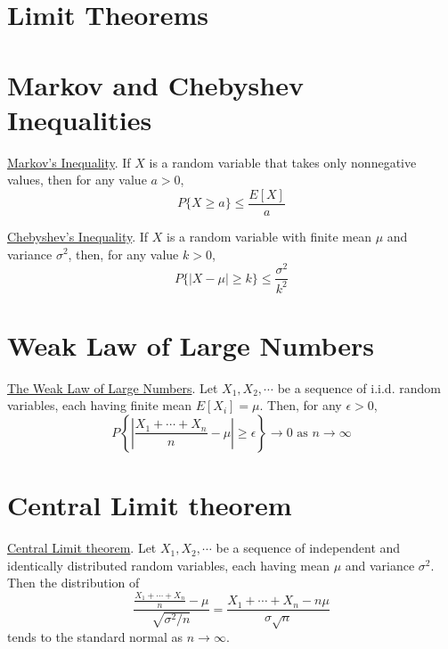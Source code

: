 \section{Limit Theorems}
\section{Markov and Chebyshev Inequalities}
\begin{thm}
	{\underline{Markov's Inequality}}. If $X$ is a random variable that takes only nonnegative values, then for any value $a > 0$, $$P\{X \ge a\} \le \frac{E[X]}{a}$$
\end{thm}

\begin{thm}
	{\underline{Chebyshev's Inequality}}. If $X$ is a random variable with finite mean $\mu$ and variance $\sigma^2$, then, for any value $k > 0$, $$P\{|X-\mu| \ge k\} \le \frac{\sigma^2}{k^2}$$
\end{thm}

\section{Weak Law of Large Numbers}
\begin{thm}
	{\underline{The Weak Law of Large Numbers}}. Let $X_1, X_2, \cdots$ be a sequence of i.i.d. random variables, each having finite mean $E[X_i] = \mu$. Then, for any $\epsilon > 0$, $$P\left\{\left|\frac{X_1+\cdots+X_n}{n} - \mu\right| \ge \epsilon \right\} \to 0 \mbox{ as } n \to \infty$$
\end{thm}

\section{Central Limit theorem}
\begin{thm}
	{\underline{Central Limit theorem}}. Let $X_1, X_2, \cdots$ be a sequence of independent and identically distributed random variables, each having mean $\mu$ and variance $\sigma^2$. Then the distribution of $$\frac{\frac{X_1+\cdots+X_n}{n}-\mu}{\sqrt{\sigma^2/n}} = \frac{X_1+\cdots+X_n - n\mu}{\sigma \sqrt{n}}$$ tends to the standard normal as $n \to \infty$.
\end{thm} 